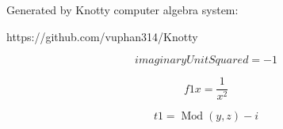\documentclass[letterpaper, 10pt]{extarticle}
\begin{document}
Generated by Knotty computer algebra system:

https://github.com/vuphan314/Knotty

\hrulefill

\begin{dmath*}
imaginaryUnitSquared =
    -1
\end{dmath*}


\begin{dmath*}
f1x =
    \frac{1}{x^{2}}
\end{dmath*}


\begin{dmath*}
t1 =
    \operatorname{Mod}{\left (y,z \right )} - i
\end{dmath*}
\end{document}

